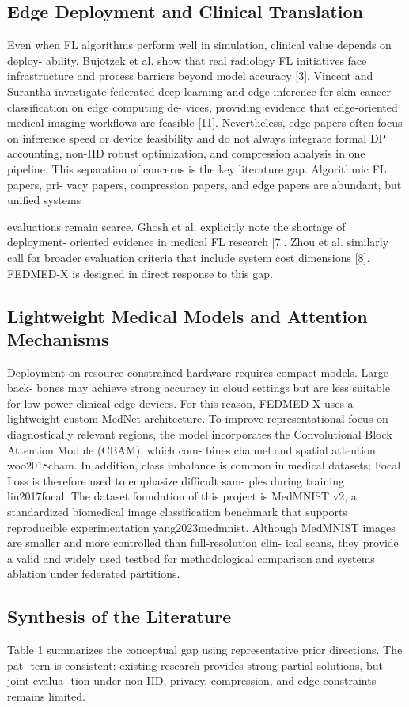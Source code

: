 \documentclass[12pt,a4paper]{report}
\begin{document}
\subsection{Edge Deployment and Clinical Translation}
Even when FL algorithms perform well in simulation, clinical value depends on deploy- ability. Bujotzek et al. show that real radiology FL initiatives face infrastructure and process barriers beyond model accuracy [3]. Vincent and Surantha investigate federated deep learning and edge inference for skin cancer classification on edge computing de- vices, providing evidence that edge-oriented medical imaging workflows are feasible [11].
Nevertheless, edge papers often focus on inference speed or device feasibility and do not always integrate formal DP accounting, non-IID robust optimization, and compression analysis in one pipeline.
This separation of concerns is the key literature gap. Algorithmic FL papers, pri- vacy papers, compression papers, and edge papers are abundant, but unified systems

evaluations remain scarce. Ghosh et al. explicitly note the shortage of deployment- oriented evidence in medical FL research [7]. Zhou et al. similarly call for broader evaluation criteria that include system cost dimensions [8]. FEDMED-X is designed in direct response to this gap.
\subsection{Lightweight Medical Models and Attention Mechanisms}
Deployment on resource-constrained hardware requires compact models. Large back- bones may achieve strong accuracy in cloud settings but are less suitable for low-power clinical edge devices. For this reason, FEDMED-X uses a lightweight custom MedNet architecture. To improve representational focus on diagnostically relevant regions, the model incorporates the Convolutional Block Attention Module (CBAM), which com- bines channel and spatial attention woo2018cbam. In addition, class imbalance is common in medical datasets; Focal Loss is therefore used to emphasize difficult sam- ples during training lin2017focal.
The dataset foundation of this project is MedMNIST v2, a standardized biomedical image classification benchmark that supports reproducible experimentation yang2023medmnist.
Although MedMNIST images are smaller and more controlled than full-resolution clin- ical scans, they provide a valid and widely used testbed for methodological comparison and systems ablation under federated partitions.
\subsection{Synthesis of the Literature}
Table 1 summarizes the conceptual gap using representative prior directions. The pat- tern is consistent: existing research provides strong partial solutions, but joint evalua- tion under non-IID, privacy, compression, and edge constraints remains limited.
\end{document}
